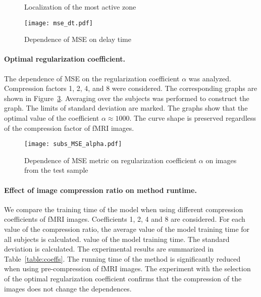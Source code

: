 \documentclass{article}
\begin{document}
\begin{figure}[h!]
	\centering
	\hfill
	\hfill
	\caption{Localization of the most active zone}
	\label{fig:local}
\end{figure}

\begin{figure}[h!]
	\centering
	\texttt{[image: mse\_dt.pdf]}
	\caption{Dependence of MSE on delay time}
	\label{fig:mse-dt}
\end{figure}

\paragraph*{Optimal regularization coefficient.}

The dependence of MSE on the regularization coefficient $\alpha$ was analyzed.
Compression factors 1, 2, 4, and 8 were considered.
The corresponding graphs are shown in Figure~\ref{fig:mse-alpha}.
Averaging over the subjects was performed to construct the graph.
The limits of standard deviation are marked.
The graphs show that the optimal value of the coefficient $\alpha \approx 1000$.
The curve shape is preserved regardless of the compression factor of fMRI images.

\begin{figure}[h!]
	\centering
	\texttt{[image: subs\_MSE\_alpha.pdf]}
	\caption{Dependence of MSE metric on regularization coefficient $\alpha$ on images from the test sample}
	\label{fig:mse-alpha}
\end{figure}

\paragraph*{Effect of image compression ratio on method runtime.}

We compare the training time of the model when using different
compression coefficients of fMRI images. Coefficients 1, 2, 4 and 8 are considered.
For each value of the compression ratio, the average value of the model training time for all subjects is calculated.
value of the model training time. The standard deviation is calculated.
The experimental results are summarized in Table~\ref{table:coeffs}.
The running time of the method is significantly reduced when using
pre-compression of fMRI images. 
The experiment with the selection of the optimal regularization coefficient
confirms that the compression of the images does not change the dependences.
\end{document}
